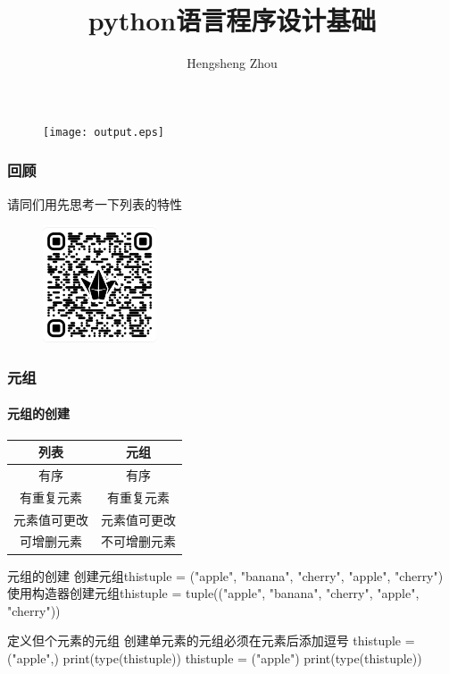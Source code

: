 \documentclass{beamer}
\title{python语言程序设计基础}
\author{Hengsheng Zhou}
\institute{电信与智能制造学院}
\begin{document}
\begin{frame}[t]
	\titlepage
	\begin{figure}
		\begin{center}
			\texttt{[image: output.eps]}
		\end{center}
	\end{figure}


\end{frame}
\begin{frame}
	\frametitle{回顾}
	请同们用先思考一下列表的特性
	\begin{figure}[htpb]
		\centering
		\includegraphics[width=0.3\textwidth]{discussion1.png}
		\label{fig:}
	\end{figure}
\end{frame}
\begin{frame}
	\frametitle{元组}
	\framesubtitle{元组的创建}
	\begin{table}[htpb]
		\centering
		\label{tab:label}
		\begin{tabular}{|c|c|}
			\hline
			列表     & 元组     \\
			\hline
			有序     & 有序     \\
			\hline
			有重复元素  & 有重复元素  \\
			\hline
			元素值可更改 & 元素值可更改 \\
			\hline
			可增删元素  & 不可增删元素 \\
			\hline
		\end{tabular}
	\end{table}
	\pause
	\begin{block}{元组的创建}
		创建元组thistuple = ("apple", "banana", "cherry", "apple", "cherry")
		使用构造器创建元组thistuple = tuple(("apple", "banana", "cherry", "apple", "cherry"))
	\end{block}

	\pause
	\begin{alertblock}{定义但个元素的元组}
		创建单元素的元组必须在元素后添加逗号
		thistuple = ("apple",)
		print(type(thistuple))
		thistuple = ("apple")
		print(type(thistuple))
	\end{alertblock}

\end{frame}
\end{document}
